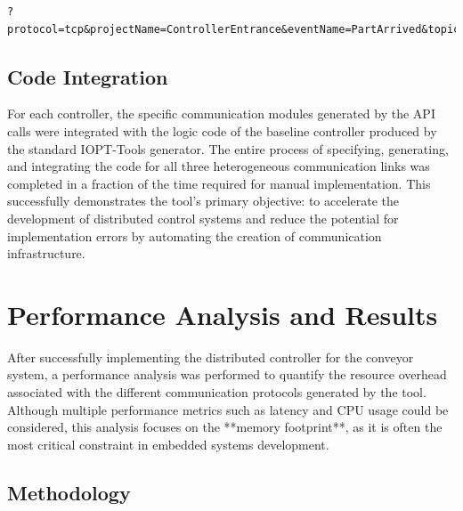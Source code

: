 \begin{verbatim}
?protocol=tcp&projectName=ControllerEntrance&eventName=PartArrived&topic=conveyor/status
\end{verbatim}

\subsection{Code Integration}
For each controller, the specific communication modules generated by the API calls were integrated with the logic code of the baseline controller produced by the standard IOPT-Tools generator. The entire process of specifying, generating, and integrating the code for all three heterogeneous communication links was completed in a fraction of the time required for manual implementation. This successfully demonstrates the tool's primary objective: to accelerate the development of distributed control systems and reduce the potential for implementation errors by automating the creation of communication infrastructure.



\section{Performance Analysis and Results}
\label{sec:performance_analysis}

After successfully implementing the distributed controller for the conveyor system, a performance analysis was performed to quantify the resource overhead associated with the different communication protocols generated by the tool. Although multiple performance metrics such as latency and CPU usage could be considered, this analysis focuses on the **memory footprint**, as it is often the most critical constraint in embedded systems development.

\subsection{Methodology}
\label{subsec:analysis_methodology}

